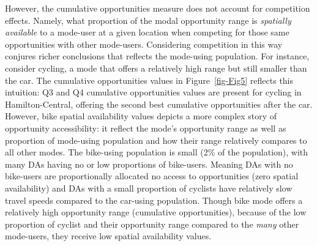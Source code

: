 \documentclass[
  authoryear,
  preprint,
  3p]{elsarticle}
\begin{document}
However, the cumulative opportunities measure does not account for
competition effects. Namely, what proportion of the modal opportunity
range is \emph{spatially available} to a mode-user at a given location
when competing for those same opportunities with other mode-users.
Considering competition in this way conjures richer conclusions that
reflects the mode-using population. For instance, consider cycling, a
mode that offers a relatively high range but still smaller than the car.
The cumulative opportunities values in Figure~\ref{fig-Fig5} reflects
this intuition: Q3 and Q4 cumulative opportunities values are present
for cycling in Hamilton-Central, offering the second best cumulative
opportunities after the car. However, bike spatial availability values
depicts a more complex story of opportunity accessibility: it reflect
the mode's opportunity range as well as proportion of mode-using
population and how their range relatively compares to all other modes.
The bike-using population is small (2\% of the population), with many
DAs having no or low proportions of bike-users. Meaning DAs with no
bike-users are proportionally allocated no access to opportunities (zero
spatial availability) and DAs with a small proportion of cyclists have
relatively slow travel speeds compared to the car-using population.
Though bike mode offers a relatively high opportunity range (cumulative
opportunities), because of the low proportion of cyclist and their
opportunity range compared to the \emph{many} other mode-users, they
receive low spatial availability values.
\end{document}
